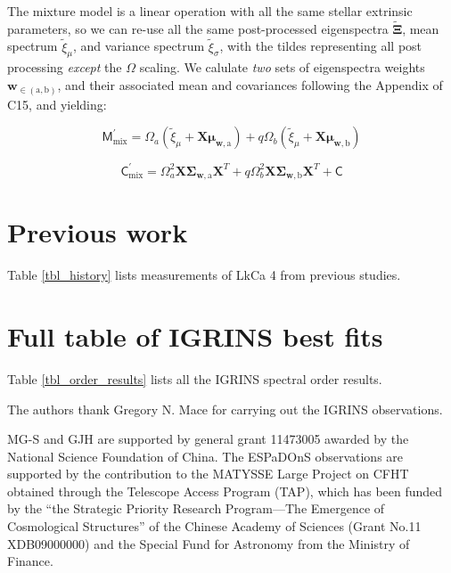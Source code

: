 \documentclass[twocolumn]{emulateapj}%
\newcommand{\iancze}{{\sc C15}}
\newcommand{\name}{LkCa 4 }
\begin{document}
The mixture model is a linear operation with all the same stellar extrinsic parameters, so we can re-use all the same post-processed eigenspectra $\widetilde{\mathbf{\Xi}}$, mean spectrum $\widetilde{\xi}_\mu$, and variance spectrum $\widetilde{\xi}_\sigma$, with the tildes representing all post processing \emph{except} the $\Omega$ scaling.  We calulate \emph{two} sets of eigenspectra weights $\mathbf{w}_{\in (\mathrm{a}, \mathrm{b})}$, and their associated mean and covariances following the Appendix of \iancze, and yielding:

\begin{equation}
  \mathsf{M}_{\mathrm{mix}}^\prime = \Omega_a (\widetilde{\xi}_\mu + \mathbf{X} \mathbf{\mu}_{\mathbf{w}, \mathrm{a}}) + q \Omega_b (\widetilde{\xi}_\mu + \mathbf{X} \mathbf{\mu}_{\mathbf{w}, \mathrm{b}})
\end{equation}

\begin{equation}
  \mathsf{C}_{\mathrm{mix}}^\prime = \Omega_a^2 \mathbf{X} \mathbf{\Sigma}_\mathbf{w, \mathrm{a}} \mathbf{X}^T + q \Omega_b^2 \mathbf{X} \mathbf{\Sigma}_\mathbf{w, \mathrm{b}} \mathbf{X}^T + \mathsf{C}
  \label{eqn:modC}
\end{equation}


\section{Previous work}

Table \ref{tbl_history} lists measurements of \name from previous studies.



\section{Full table of IGRINS best fits}

Table \ref{tbl_order_results} lists all the IGRINS spectral order results.



\acknowledgements
The authors thank Gregory N. Mace for carrying out the IGRINS observations. 

MG-S and GJH are supported by general grant 11473005 awarded by the National Science Foundation of China.   The ESPaDOnS observations are supported by the contribution to the MATYSSE Large Project on CFHT obtained through the Telescope Access Program (TAP), which has been funded by the ``the Strategic Priority Research Program---The Emergence of Cosmological Structures'' of the Chinese Academy of Sciences (Grant No.11 XDB09000000) and the Special Fund for Astronomy from the Ministry of Finance. 
\end{document}
